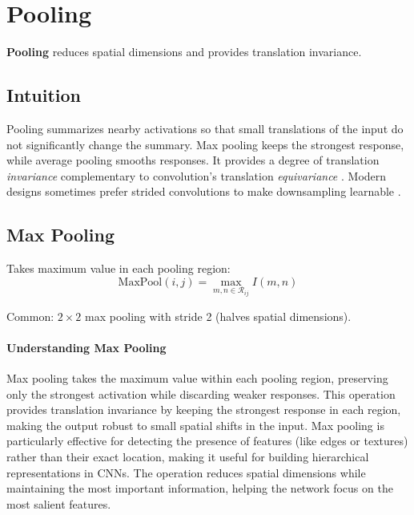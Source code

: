 
\section{Pooling}
\label{sec:pooling}


\textbf{Pooling} reduces spatial dimensions and provides translation invariance.

\subsection*{Intuition}
Pooling summarizes nearby activations so that small translations of the input do not significantly change the summary. Max pooling keeps the strongest response, while average pooling smooths responses. It provides a degree of translation \emph{invariance} complementary to convolution's translation \emph{equivariance} . Modern designs sometimes prefer strided convolutions to make downsampling learnable \cite{GoodfellowEtAl2016,He2016}.

\subsection{Max Pooling}

Takes maximum value in each pooling region:
\begin{equation}
\text{MaxPool}(i,j) = \max_{m,n \in \mathcal{R}_{ij}} I(m,n)
\end{equation}

Common: $2 \times 2$ max pooling with stride 2 (halves spatial dimensions).

\paragraph{Understanding Max Pooling}
Max pooling takes the maximum value within each pooling region, preserving only the strongest activation while discarding weaker responses. This operation provides translation invariance by keeping the strongest response in each region, making the output robust to small spatial shifts in the input. Max pooling is particularly effective for detecting the presence of features (like edges or textures) rather than their exact location, making it useful for building hierarchical representations in CNNs. The operation reduces spatial dimensions while maintaining the most important information, helping the network focus on the most salient features.

